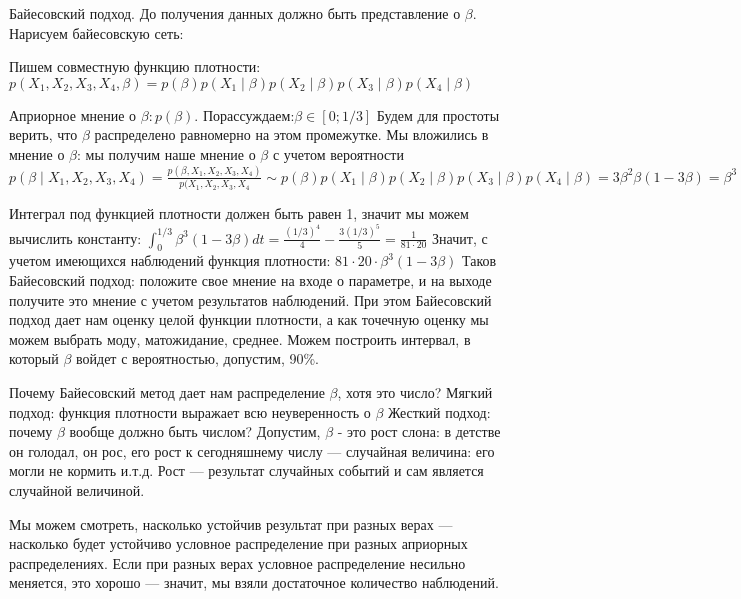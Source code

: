 Байесовский подход.
До получения данных должно быть представление о $\beta$. Нарисуем байесовскую сеть: 


Пишем совместную функцию плотности: $p(X_1,X_2,X_3,X_4,\beta)=p(\beta)p(X_1 \mid \beta)p(X_2 \mid \beta)p(X_3 \mid \beta)p(X_4 \mid \beta)$

Априорное мнение о  $\beta: p(\beta)$.
Порассуждаем:$\beta \in [0;1/3]$
Будем для простоты верить, что  $\beta$ распределено равномерно на этом промежутке. 
Мы вложились в мнение о $\beta$: мы получим наше мнение о $\beta$ с учетом вероятности $p(\beta \mid X_1,X_2,X_3,X_4)=\frac{p(\beta,X_1,X_2,X_3,X_4)}{p(X_1,X_2,X_3,X_4}\sim p(\beta)p(X_1 \mid \beta)p(X_2 \mid \beta)p(X_3 \mid \beta)p(X_4 \mid \beta)=3\beta^2\beta(1-3\beta)=\beta^3(1-3\beta)$

Интеграл под функцией плотности должен быть равен 1, значит мы можем вычислить константу:
$\int_0^{1/3} \beta^3(1-3\beta)dt=\frac{(1/3)^4}{4}-\frac{3(1/3)^5}{5}=\frac{1}{81\cdot20}$
Значит, с учетом имеющихся наблюдений функция плотности:
$81\cdot20\cdot\beta^3(1-3\beta)$
Таков Байесовский подход: положите свое мнение на входе о параметре, и на выходе получите это мнение с учетом результатов наблюдений. 
При этом Байесовский подход дает нам оценку целой функции плотности, а как точечную оценку мы можем выбрать моду, матожидание, среднее. Можем построить интервал, в который $\beta$ войдет с вероятностью, допустим, 90\%.

Почему Байесовский метод дает нам распределение $\beta$, хотя это число?
Мягкий подход: функция плотности выражает всю неуверенность о $\beta$
Жесткий подход: почему $\beta$ вообще должно быть числом? Допустим, $\beta$ - это рост слона: в детстве он голодал, он рос, его рост  к сегодняшнему числу --- случайная величина: его могли не кормить и.т.д. Рост --- результат случайных событий и сам является случайной величиной.

Мы можем смотреть, насколько устойчив результат при разных верах --- насколько будет устойчиво условное распределение при разных априорных распределениях. Если при разных верах условное распределение несильно меняется, это хорошо --- значит, мы взяли достаточное количество наблюдений. 









